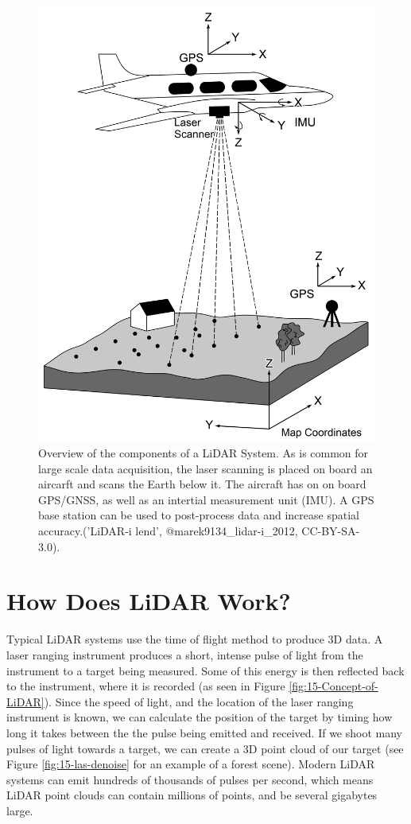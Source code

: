 \documentclass[
]{book}
\begin{document}
\begin{figure}
\includegraphics[width=0.6\linewidth]{images/15-LiDAR-System} \caption{Overview of the components of a LiDAR System. As is common for large scale data acquisition, the laser scanning is placed on board an aircarft and scans the Earth below it. The aircraft has on on board GPS/GNSS, as well as an intertial measurement unit (IMU). A GPS base station can be used to post-process data and increase spatial accuracy.('LiDAR-i lend', @marek9134_lidar-i_2012, CC-BY-SA-3.0).}\label{fig:15-LiDAR-System}
\end{figure}

\section{How Does LiDAR Work?}\label{how-does-lidar-work}

Typical LiDAR systems use the time of flight method to produce 3D data. A laser ranging instrument produces a short, intense pulse of light from the instrument to a target being measured. Some of this energy is then reflected back to the instrument, where it is recorded (as seen in Figure \ref{fig:15-Concept-of-LiDAR}). Since the speed of light, and the location of the laser ranging instrument is known, we can calculate the position of the target by timing how long it takes between the the pulse being emitted and received. If we shoot many pulses of light towards a target, we can create a 3D point cloud of our target (see Figure \ref{fig:15-las-denoise} for an example of a forest scene). Modern LiDAR systems can emit hundreds of thousands of pulses per second, which means LiDAR point clouds can contain millions of points, and be several gigabytes large.
\end{document}
